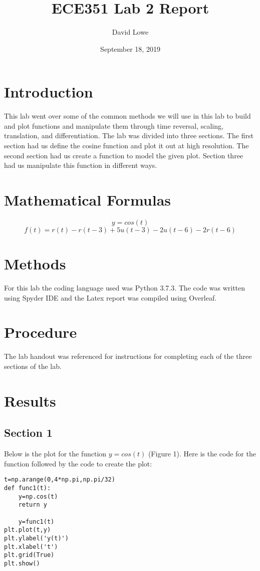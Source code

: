 \documentclass{article}
\title{ECE351 Lab 2 Report}
\author{David Lowe }
\date{September 18, 2019}
\begin{document}
\maketitle

\section*{Introduction}
This lab went over some of the common methods we will use in this lab to build and plot functions and manipulate them through time reversal, scaling, translation, and differentiation. The lab was divided into three sections. The first section had us define the cosine function and plot it out at high resolution. The second section had us create a function to model the given plot. Section three had us manipulate this function in different ways.

\section*{Mathematical Formulas}
$$y=cos(t)$$
$$f(t)=r(t)-r(t-3)+5u(t-3)-2u(t-6)-2r(t-6)$$

\section*{Methods}
For this lab the coding language used was Python 3.7.3. The code was written using Spyder IDE and the Latex report was compiled using Overleaf.

\section*{Procedure}
The lab handout was referenced for instructions for completing each of the three sections of the lab.
\newpage

\section*{Results}
\subsection*{Section 1}
Below is the plot for the function $y=cos(t)$ (Figure 1). Here is the code for the function followed by the code to create the plot:

\begin{verbatim}
t=np.arange(0,4*np.pi,np.pi/32)
def func1(t):
    y=np.cos(t)
    return y
    
    y=func1(t)
plt.plot(t,y)
plt.ylabel('y(t)')
plt.xlabel('t')
plt.grid(True)
plt.show()
\end{verbatim}  
\end{document}
